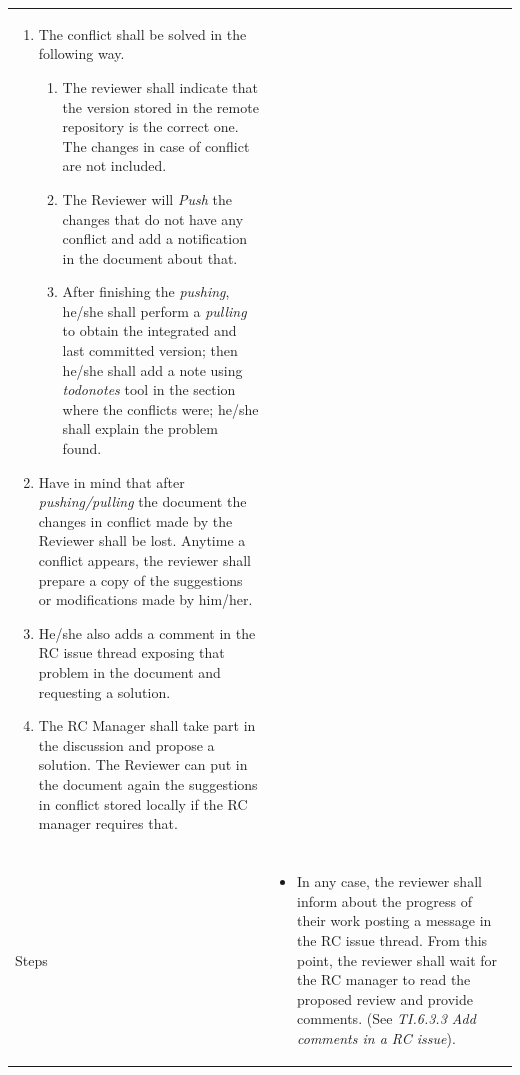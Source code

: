 \documentclass{template/openetcs_article}
\begin{document}
\begin{flushleft}
\begin{supertabular}{|m{2cm}|m{13cm}|}
\begin{itemize}
\begin{itemize}
\begin{enumerate}
\item The conflict shall be solved in the following way.
\begin{enumerate}
\item The reviewer shall indicate that the version stored in the remote repository is the correct one. The changes in case of conflict are not included. 
\item The Reviewer will {\it Push} the changes that do not have any conflict and add a notification in the document about that. 
\item After finishing the {\it pushing}, he/she shall perform a {\it pulling} to obtain the integrated and last committed version; then he/she shall add a note using {\it todonotes} tool in the section where the conflicts were; he/she shall explain the problem found. 
\end{enumerate}
\item Have in mind that after {\it pushing/pulling} the document the changes in conflict made by the Reviewer shall be lost. Anytime a conflict appears, the reviewer shall prepare a copy of the suggestions or modifications made by him/her.
\item He/she also adds a comment in the RC issue thread exposing that problem in the document and requesting a solution.
\item The RC Manager shall take part in the discussion and propose a solution. The Reviewer can put in the document again the suggestions in conflict stored locally if the RC manager requires that.
\end{enumerate}
\end{itemize}
\end{itemize}
\\\\\hline
Steps &
\begin{itemize}
\item In any case, the reviewer shall inform about the progress of their work posting a message in the RC issue thread. From this point, the reviewer shall wait for the RC manager to read the proposed review and provide comments. (See {\it TI.6.3.3 Add comments in a RC issue}).
\end{itemize}
\\\hline
\end{supertabular}
\end{flushleft}
\end{document}
